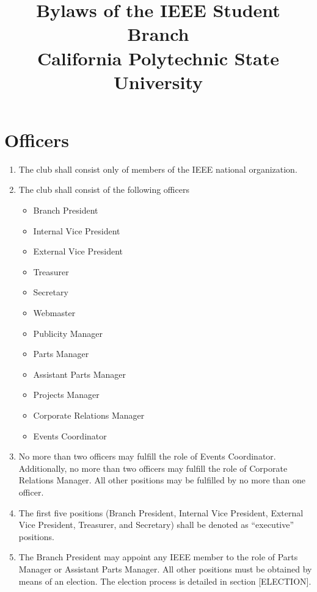 \documentclass{article}
\date{}
\begin{document}
\title{
  \huge{Bylaws of the IEEE Student Branch}\\
  \Large{California Polytechnic State University}
}
\maketitle
\thispagestyle{empty}


\tableofcontents
\clearpage


\section{Officers}

\begin{enumerate}
\item The club shall consist only of members of the IEEE national organization.
\item The club shall consist of the following officers
  \begin{itemize}
    \item Branch President
    \item Internal Vice President
    \item External Vice President
    \item Treasurer
    \item Secretary
    \item Webmaster
    \item Publicity Manager
    \item Parts Manager 
    \item Assistant Parts Manager
    \item Projects Manager
    \item Corporate Relations Manager
    \item Events Coordinator
  \end{itemize}
\item No more than two officers may fulfill the role of Events Coordinator. Additionally, no more than two officers may fulfill the role of Corporate Relations Manager. All other positions may be fulfilled by no more than one officer.
\item The first five positions (Branch President, Internal Vice President, External Vice President, Treasurer, and Secretary) shall be denoted as ``executive'' positions. 
\item The Branch President may appoint any IEEE member to the role of Parts Manager or Assistant Parts Manager. All other positions must be obtained by means of an election. The election process is detailed in section [ELECTION].

\end{enumerate}
\end{document}
